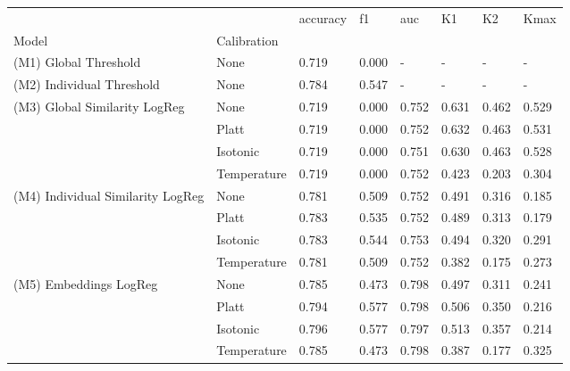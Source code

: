 \begin{tabular}{llllllll}
\toprule
 &  & accuracy & f1 & auc & K1 & K2 & Kmax \\
Model & Calibration &  &  &  &  &  &  \\
\midrule
(M1) Global Threshold & None & 0.719 & 0.000 & - & - & - & - \\
\cline{1-8}
(M2) Individual Threshold & None & 0.784 & 0.547 & - & - & - & - \\
\cline{1-8}
\multirow[t]{4}{*}{(M3) Global Similarity LogReg} & None & 0.719 & 0.000 & 0.752 & 0.631 & 0.462 & 0.529 \\
 & Platt & 0.719 & 0.000 & 0.752 & 0.632 & 0.463 & 0.531 \\
 & Isotonic & 0.719 & 0.000 & 0.751 & 0.630 & 0.463 & 0.528 \\
 & Temperature & 0.719 & 0.000 & 0.752 & 0.423 & 0.203 & 0.304 \\
\cline{1-8}
\multirow[t]{4}{*}{(M4) Individual Similarity LogReg} & None & 0.781 & 0.509 & 0.752 & 0.491 & 0.316 & 0.185 \\
 & Platt & 0.783 & 0.535 & 0.752 & 0.489 & 0.313 & 0.179 \\
 & Isotonic & 0.783 & 0.544 & 0.753 & 0.494 & 0.320 & 0.291 \\
 & Temperature & 0.781 & 0.509 & 0.752 & 0.382 & 0.175 & 0.273 \\
\cline{1-8}
\multirow[t]{4}{*}{(M5) Embeddings LogReg} & None & 0.785 & 0.473 & 0.798 & 0.497 & 0.311 & 0.241 \\
 & Platt & 0.794 & 0.577 & 0.798 & 0.506 & 0.350 & 0.216 \\
 & Isotonic & 0.796 & 0.577 & 0.797 & 0.513 & 0.357 & 0.214 \\
 & Temperature & 0.785 & 0.473 & 0.798 & 0.387 & 0.177 & 0.325 \\
\cline{1-8}
\bottomrule
\end{tabular}
